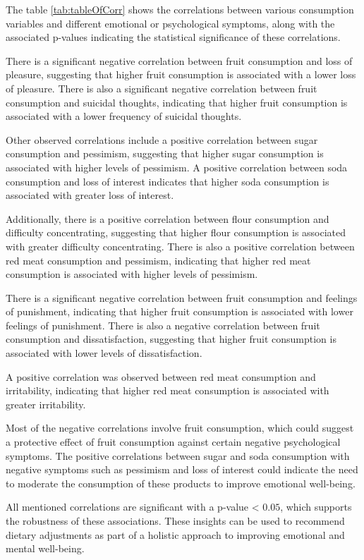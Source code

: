 \documentclass[jou]{apa7}
\begin{document}
The table \ref{tab:tableOfCorr} shows the correlations between various consumption variables and different emotional or psychological symptoms, along with the associated p-values indicating the statistical significance of these correlations.

There is a significant negative correlation between fruit consumption and loss of pleasure, suggesting that higher fruit consumption is associated with a lower loss of pleasure. There is also a significant negative correlation between fruit consumption and suicidal thoughts, indicating that higher fruit consumption is associated with a lower frequency of suicidal thoughts.

Other observed correlations include a positive correlation between sugar consumption and pessimism, suggesting that higher sugar consumption is associated with higher levels of pessimism. A positive correlation between soda consumption and loss of interest indicates that higher soda consumption is associated with greater loss of interest.

Additionally, there is a positive correlation between flour consumption and difficulty concentrating, suggesting that higher flour consumption is associated with greater difficulty concentrating. There is also a positive correlation between red meat consumption and pessimism, indicating that higher red meat consumption is associated with higher levels of pessimism.

There is a significant negative correlation between fruit consumption and feelings of punishment, indicating that higher fruit consumption is associated with lower feelings of punishment. There is also a negative correlation between fruit consumption and dissatisfaction, suggesting that higher fruit consumption is associated with lower levels of dissatisfaction.

A positive correlation was observed between red meat consumption and irritability, indicating that higher red meat consumption is associated with greater irritability.

Most of the negative correlations involve fruit consumption, which could suggest a protective effect of fruit consumption against certain negative psychological symptoms. The positive correlations between sugar and soda consumption with negative symptoms such as pessimism and loss of interest could indicate the need to moderate the consumption of these products to improve emotional well-being.

All mentioned correlations are significant with a p-value \textless{} $0.05$, which supports the robustness of these associations. These insights can be used to recommend dietary adjustments as part of a holistic approach to improving emotional and mental well-being.
\end{document}
